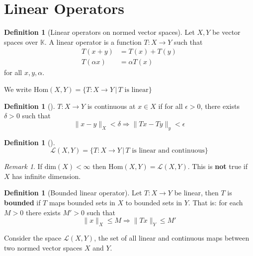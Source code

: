 \documentclass[10pt, oneside, reqno]{amsbook}
\theoremstyle{plain}%
\theoremstyle{definition}
\newtheorem{defn}[thm]{Definition}
\theoremstyle{remark}
\newtheorem*{rem}{Remark}
\newcommand{\K}{\mathbb{K}}
\begin{document}
\section{Linear Operators} %
\label{sec:linear_operators}

\begin{defn}[Linear operators on normed vector spaces]
    Let $X,Y$ be vector spaces over $\K$.  A linear operator is a function $T:X \rightarrow Y$ such that 
    \begin{align*}
        T(x+y) &= T(x) + T(y) \\
        T(\alpha x) &= \alpha T(x)
    \end{align*}
    for all $x,y,\alpha$.

    We write $\text{Hom}(X,Y) = \{ T: X \rightarrow Y \, | \, \text{$T$ is linear} \}$
\end{defn}

\begin{defn}[]
    $T: X \rightarrow Y$ is continuous at $x \in X$ if for all $\epsilon > 0$, there exists $\delta > 0$ such that \[
            \| x - y \|_X < \delta \Rightarrow \| Tx - Ty \|_y < \epsilon 
    \]
\end{defn}

\begin{defn}[]
    \[
    \mathcal{L}(X,Y) = \{ T:  X \rightarrow Y \, | \, \text{$T$ is linear and continuous} \}
    \]
\end{defn}

\begin{rem}
    If $\text{dim}(X) < \infty$ then $\text{Hom}(X,Y) = \mathcal{L}(X,Y)$.  This is \textbf{not} true if $X$ has infinite dimension.
\end{rem}

\begin{defn}[Bounded linear operator]
    Let $T: X \rightarrow Y$ be linear, then $T$ is \textbf{bounded} if $T$ maps bounded sets in $X$ to bounded sets in $Y$.  That is: for each $M > 0$ there exists $M' > 0$ such that \[
        \| x \|_X \leq M \Rightarrow \|Tx\|_Y \leq M'
    \]
\end{defn}

Consider the space $\mathcal{L}(X, Y)$, the set of all linear and continuous maps between two normed vector spaces $X$ and $Y$.  
\end{document}
